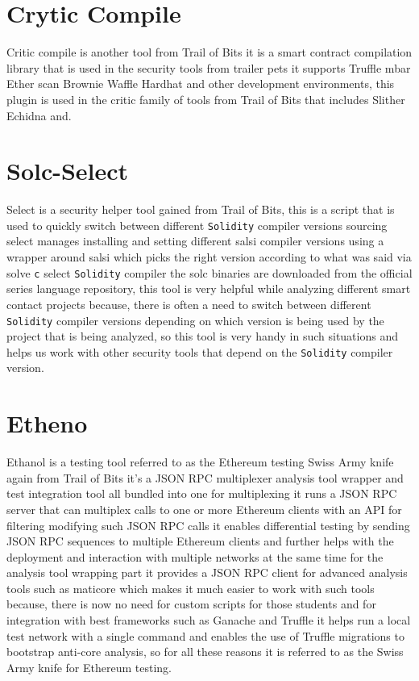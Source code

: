 \section{Crytic Compile}

Critic compile is another tool from Trail of Bits it is a smart contract compilation library that is used in the security tools from trailer pets it supports Truffle mbar Ether scan Brownie Waffle Hardhat and other development environments, this plugin is used in the critic family of tools from Trail of Bits that includes Slither Echidna and.

\section{Solc-Select}

Select is a security helper tool gained from Trail of Bits, this is a script that is used to quickly switch between different \verb|Solidity| compiler versions sourcing select manages installing and setting different salsi compiler versions using a wrapper around salsi which picks the right version according to what was said via solve \verb|c| select \verb|Solidity| compiler the solc binaries are downloaded from the official series language repository, this tool is very helpful while analyzing different smart contact projects because, there is often a need to switch between different \verb|Solidity| compiler versions depending on which version is being used by the project that is being analyzed, so this tool is very handy in such situations and helps us work with other security tools that depend on the \verb|Solidity| compiler version.

\section{Etheno}

Ethanol is a testing tool referred to as the Ethereum testing Swiss Army knife again from Trail of Bits it's a JSON RPC multiplexer analysis tool wrapper and test integration tool all bundled into one for multiplexing it runs a JSON RPC server that can multiplex calls to one or more Ethereum clients with an API for filtering modifying such JSON RPC calls it enables differential testing by sending JSON RPC sequences to multiple Ethereum clients and further helps with the deployment and interaction with multiple networks at the same time for the analysis tool wrapping part it provides a JSON RPC client for advanced analysis tools such as maticore which makes it much easier to work with such tools because, there is now no need for custom scripts for those students and for integration with best frameworks such as Ganache and Truffle it helps run a local test network with a single command and enables the use of Truffle migrations to bootstrap anti-core analysis, so for all these reasons it is referred to as the Swiss Army knife for Ethereum testing.

